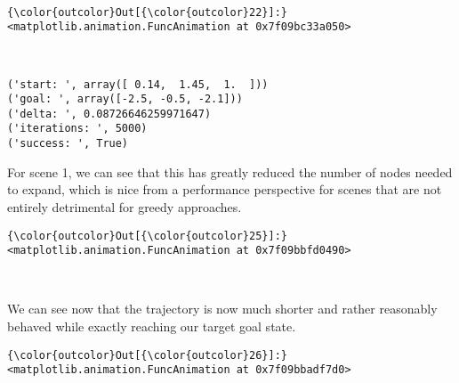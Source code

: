 \documentclass{article}
\begin{document}
    \begin{center}
    \end{center}
    { \hspace*{\fill} \\}
    

            \begin{Verbatim}[commandchars=\\\{\}]
{\color{outcolor}Out[{\color{outcolor}22}]:} <matplotlib.animation.FuncAnimation at 0x7f09bc33a050>
\end{Verbatim}
        
    \begin{center}
    \end{center}
    { \hspace*{\fill} \\}
    

    \begin{Verbatim}[commandchars=\\\{\}]
('start: ', array([ 0.14,  1.45,  1.  ]))
('goal: ', array([-2.5, -0.5, -2.1]))
('delta: ', 0.08726646259971647)
('iterations: ', 5000)
('success: ', True)
    \end{Verbatim}

    For scene 1, we can see that this has greatly reduced the number of
nodes needed to expand, which is nice from a performance perspective for
scenes that are not entirely detrimental for greedy approaches.



            \begin{Verbatim}[commandchars=\\\{\}]
{\color{outcolor}Out[{\color{outcolor}25}]:} <matplotlib.animation.FuncAnimation at 0x7f09bbfd0490>
\end{Verbatim}
        
    \begin{center}
    \end{center}
    { \hspace*{\fill} \\}
    
    We can see now that the trajectory is now much shorter and rather
reasonably behaved while exactly reaching our target goal state.


            \begin{Verbatim}[commandchars=\\\{\}]
{\color{outcolor}Out[{\color{outcolor}26}]:} <matplotlib.animation.FuncAnimation at 0x7f09bbadf7d0>
\end{Verbatim}
        
\end{document}

